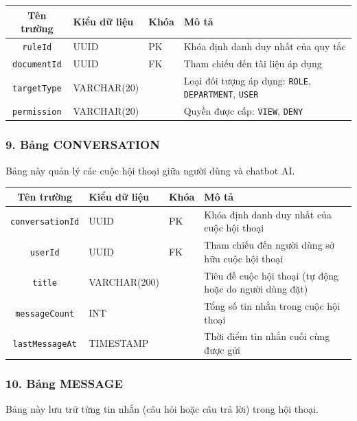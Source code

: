 \documentclass[12pt,a4paper]{report}
\begin{document}
\begin{table}[H]
\centering
\begin{tabularx}{\textwidth}{|c|l|l|X|}
\hline
\rowcolor{gray!10}
Tên trường & Kiểu dữ liệu & Khóa & Mô tả \\ \hline
\texttt{ruleId} & UUID & PK & Khóa định danh duy nhất của quy tắc \\ \hline
\texttt{documentId} & UUID & FK & Tham chiếu đến tài liệu áp dụng \\ \hline
\texttt{targetType} & VARCHAR(20) &  & Loại đối tượng áp dụng: \texttt{ROLE}, \texttt{DEPARTMENT}, \texttt{USER} \\ \hline
\texttt{permission} & VARCHAR(20) &  & Quyền được cấp: \texttt{VIEW}, \texttt{DENY} \\ \hline
\end{tabularx}
\end{table}

\subsubsection{9. Bảng CONVERSATION}
Bảng này quản lý các cuộc hội thoại giữa người dùng và chatbot AI.

\begin{table}[H]
\centering
\begin{tabularx}{\textwidth}{|c|l|l|X|}
\hline
\rowcolor{gray!10}
Tên trường & Kiểu dữ liệu & Khóa & Mô tả \\ \hline
\texttt{conversationId} & UUID & PK & Khóa định danh duy nhất của cuộc hội thoại \\ \hline
\texttt{userId} & UUID & FK & Tham chiếu đến người dùng sở hữu cuộc hội thoại \\ \hline
\texttt{title} & VARCHAR(200) &  & Tiêu đề cuộc hội thoại (tự động hoặc do người dùng đặt) \\ \hline
\texttt{messageCount} & INT &  & Tổng số tin nhắn trong cuộc hội thoại \\ \hline
\texttt{lastMessageAt} & TIMESTAMP &  & Thời điểm tin nhắn cuối cùng được gửi \\ \hline
\end{tabularx}
\end{table}

\subsubsection{10. Bảng MESSAGE}
Bảng này lưu trữ từng tin nhắn (câu hỏi hoặc câu trả lời) trong hội thoại.
\end{document}
